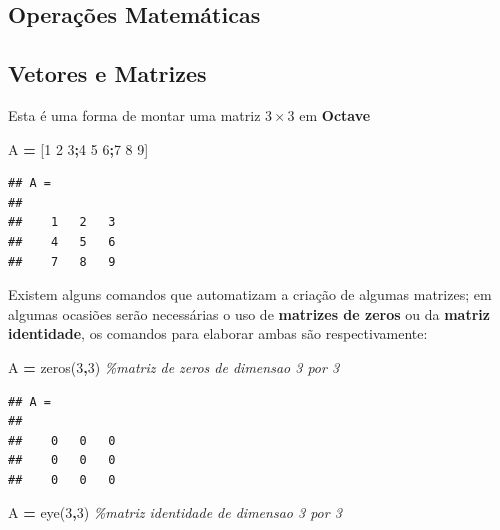 \documentclass[
]{book}
\newenvironment{Shaded}{\begin{snugshade}}{\end{snugshade}}
\newcommand{\CommentTok}[1]{\textcolor[rgb]{0.56,0.35,0.01}{\textit{#1}}}
\newcommand{\FloatTok}[1]{\textcolor[rgb]{0.00,0.00,0.81}{#1}}
\newcommand{\FunctionTok}[1]{\textcolor[rgb]{0.00,0.00,0.00}{#1}}
\newcommand{\NormalTok}[1]{#1}
\newcommand{\OperatorTok}[1]{\textcolor[rgb]{0.81,0.36,0.00}{\textbf{#1}}}
\begin{document}
\hypertarget{operauxe7uxf5es-matemuxe1ticas}{%
\subsection{Operações Matemáticas}\label{operauxe7uxf5es-matemuxe1ticas}}

\hypertarget{vetores-e-matrizes}{%
\subsection{Vetores e Matrizes}\label{vetores-e-matrizes}}

Esta é uma forma de montar uma matriz \(3 \times 3\) em \textbf{Octave}

\begin{Shaded}
\begin{Highlighting}[]
\NormalTok{A }\OperatorTok{=}\NormalTok{ [}\FloatTok{1} \FloatTok{2} \FloatTok{3}\OperatorTok{;}\FloatTok{4} \FloatTok{5} \FloatTok{6}\OperatorTok{;}\FloatTok{7} \FloatTok{8} \FloatTok{9}\NormalTok{]}
\end{Highlighting}
\end{Shaded}

\begin{verbatim}
## A =
## 
##    1   2   3
##    4   5   6
##    7   8   9
\end{verbatim}

Existem alguns comandos que automatizam a criação de algumas matrizes; em algumas ocasiões serão necessárias o uso de \textbf{matrizes de zeros} ou da \textbf{matriz identidade}, os comandos para elaborar ambas são respectivamente:

\begin{Shaded}
\begin{Highlighting}[]
\NormalTok{A }\OperatorTok{=} \FunctionTok{zeros}\NormalTok{(}\FloatTok{3}\OperatorTok{,}\FloatTok{3}\NormalTok{) }\CommentTok{\%matriz de zeros de dimensao 3 por 3}
\end{Highlighting}
\end{Shaded}

\begin{verbatim}
## A =
## 
##    0   0   0
##    0   0   0
##    0   0   0
\end{verbatim}

\begin{Shaded}
\begin{Highlighting}[]
\NormalTok{A }\OperatorTok{=} \FunctionTok{eye}\NormalTok{(}\FloatTok{3}\OperatorTok{,}\FloatTok{3}\NormalTok{) }\CommentTok{\%matriz identidade de dimensao 3 por 3}
\end{Highlighting}
\end{Shaded}
\end{document}
